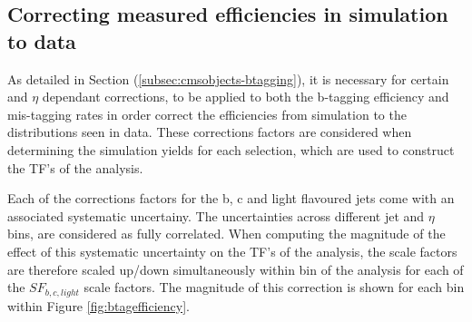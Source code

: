 \subsection{Correcting measured efficiencies in simulation to data}
\label{subsec:formulamethodsf}

As detailed in Section (\ref{subsec:cmsobjects-btagging}), it is necessary for certain \pt and $\eta$ dependant corrections, to be applied to both the b-tagging efficiency and mis-tagging rates in order correct the efficiencies from simulation to the distributions seen in data. These corrections factors are considered when determining the simulation yields for each selection, which are used to construct the \ac{TF}'s of the analysis. 

Each of the corrections factors for the b, c and light flavoured jets come with an associated systematic uncertainy. The uncertainties across different jet \pt and $\eta$ bins, are considered as fully correlated. When computing the magnitude of the effect of this systematic uncertainty on the \ac{TF}'s of the analysis, the scale factors are therefore scaled up/down simultaneously within \theht bin of the analysis for each of the $SF_{b,c,light}$ scale factors. The magnitude of this correction is shown for each \theht bin within Figure \ref{fig:btagefficiency}. 


